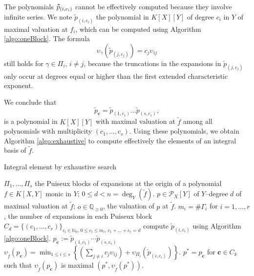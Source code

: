 \documentclass[a4paper,11pt]{amsart}%
\theoremstyle{definition}
\theoremstyle{plain}
\theoremstyle{remark}
\newcommand{\Q}{{\mathbb Q}}
\newcommand{\N}{{\mathbb N}}
\newcommand{\vardbtilde}[1]{\tilde{\raisebox{0pt}[0.85\height]{$\tilde{#1}$}}}
\begin{document}
The polynomials $\vardbtilde p_{(i, c_i)}$ cannot be effectively computed because they involve infinite series. We note $\tilde p_{(i, c_i)}$ the polynomial in $K[X][Y]$ of degree $c_i$ in $Y$ of maximal valuation at $f_i$, which can be computed using Algorithm \ref{algo:oneBlock}. The formula $$\upsilon_{\gamma}(\tilde p_{(j, c_j)}) = c_j \upsilon_{ij}$$
still holds for $\gamma \in \Pi_i$, $i \neq j$, because the truncations in the expansions in $\tilde p_{(j, c_j)}$ only occur at degrees equal or higher than the first extended characteristic exponent.

We conclude  that
$$
\tilde p_{\bm{c}} = \tilde p_{(1, c_1)} \dots \tilde p_{(s, c_s)},
$$
is a polynomial in $K[X][Y]$ with maximal valuation at $\tilde f$ among all polynomials with multiplicity $(c_1, \dots, c_s)$. Using these polynomials, we obtain Algorithm \ref{algo:exhaustive} to compute effectively the elements of an integral basis of $\tilde f$.


\begin{algorithm}[h]                      %
\caption{Integral element by exhaustive search}          %
\label{algo:exhaustive}
\begin{algorithmic}[1]
\REQUIRE $\Pi_1, \dots, \Pi_s$ the Puiseux blocks of expansions at the origin of a polynomial $f \in K[X,Y]$ monic in $Y$; $0 \leq d < n = \deg_Y(\tilde f)$.
\ENSURE $p \in {\mathcal{P}_{X}}[Y]$ of $Y$--degree $d$ of
maximal valuation at $\tilde f$; $o \in \Q_{\geq 0}$, the valuation of $p$ at $\tilde f$.
\STATE $m_i = \#\Gamma_i$ for $i = 1, \dots, r$, the number of expansions in each Puiseux block
\STATE $C_d = \{(c_1, \dots, c_r)\}_{c_i \in \N_0 \mbox{, } 0 \leq c_i \leq m_i \mbox{, } c_1 + \dots + c_r = d}$
\STATE compute $\tilde p_{(i, c_i)}$ using Algorithm \ref{algo:oneBlock}.
\ENDFOR
\STATE $p_{\bm{c}} := \tilde p_{(1,c_{1})}\cdots \tilde p_{(s, c_{s})}$
\STATE $\upsilon_{\tilde f}(p_{\bm{c}})=\min_{1 \leq i \leq s}\left\{\left(\sum_{j \ne i} c_j \upsilon_{ij}\right) + \upsilon_{\Pi_i}(\tilde p_{(i, c_i)})\right\}$.
\ENDFOR
\STATE $p^{*} = p_{\bm{c}}$ for $\bm{c} \in C_k$ such that $\upsilon_{\tilde f}(p_{\bm{c}})$ is maximal
\RETURN $(p^{*}, \upsilon_{\tilde f}(p^*))$.
\end{algorithmic}
\end{algorithm}
\end{document}
